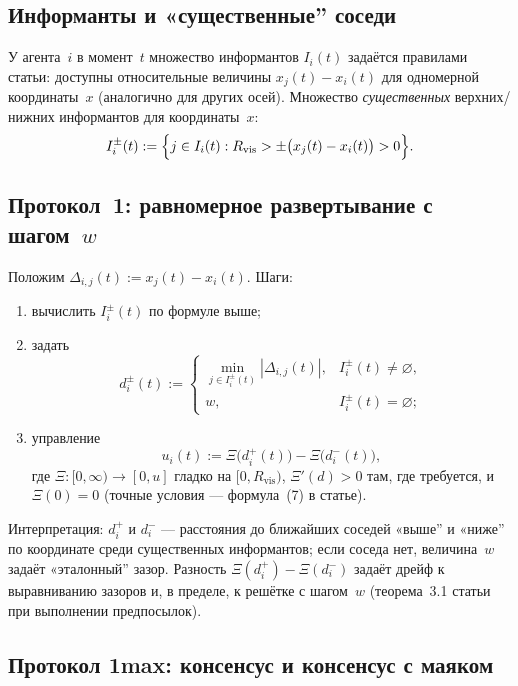 \documentclass[12pt,a4paper]{article}
\begin{document}
\subsection{Информанты и «существенные'' соседи}

У агента~$i$ в момент~$t$ множество информантов $I_i(t)$ задаётся правилами статьи: доступны относительные величины $x_j(t)-x_i(t)$ для одномерной координаты~$x$ (аналогично для других осей). Множество \emph{существенных} верхних/нижних информантов для координаты~$x$:
\begin{equation}
  I_i^{\pm}(t):=\Bigl\{j\in I_i(t): R_{\mathrm{vis}}>\pm\bigl(x_j(t)-x_i(t)\bigr)>0\Bigr\}.
\end{equation}

\subsection{Протокол~1: равномерное развертывание с шагом~$w$}

Положим $\Delta_{i,j}(t):=x_j(t)-x_i(t)$. Шаги:
\begin{enumerate}
  \item вычислить $I_i^{\pm}(t)$ по формуле выше;
  \item задать
  \begin{equation}
    d_i^{\pm}(t):=
    \begin{cases}
      \displaystyle\min_{j\in I_i^{\pm}(t)} |\Delta_{i,j}(t)|, & I_i^{\pm}(t)\neq\varnothing,\\[0.7em]
      w, & I_i^{\pm}(t)=\varnothing;
    \end{cases}
  \end{equation}
  \item управление
  \begin{equation}
    u_i(t):=\Xi\bigl(d_i^{+}(t)\bigr)-\Xi\bigl(d_i^{-}(t)\bigr),
  \end{equation}
  где $\Xi:[0,\infty)\to[0,u]$ гладко на $[0,R_{\mathrm{vis}})$, $\Xi'(d)>0$ там, где требуется, и $\Xi(0)=0$ (точные условия --- формула~(7) в статье).
\end{enumerate}
Интерпретация: $d_i^{+}$ и $d_i^{-}$ --- расстояния до ближайших соседей «выше'' и «ниже'' по координате среди существенных информантов; если соседа нет, величина~$w$ задаёт «эталонный'' зазор. Разность $\Xi(d_i^{+})-\Xi(d_i^{-})$ задаёт дрейф к выравниванию зазоров и, в пределе, к решётке с шагом~$w$ (теорема~3.1 статьи при выполнении предпосылок).

\subsection{Протокол \textbf{1max}: консенсус и консенсус с маяком}
\end{document}

